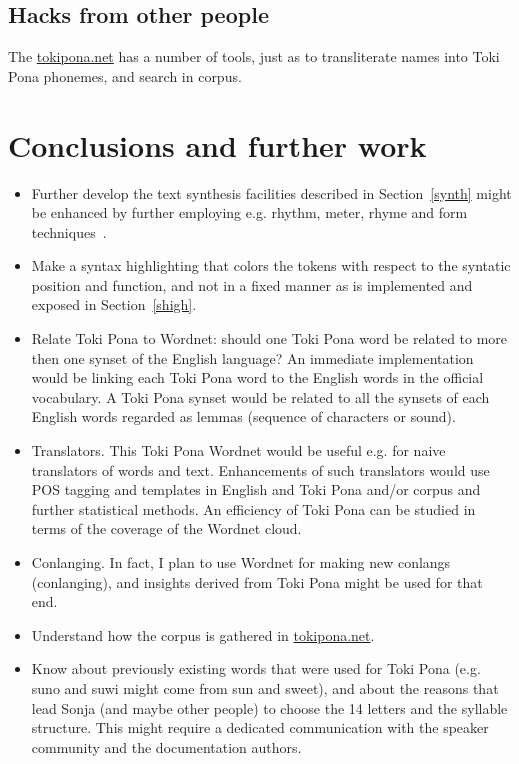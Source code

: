 \documentclass{article}
\begin{document}
\subsection{Hacks from other people}
The \url{tokipona.net} has a number of tools,
just as to transliterate names into Toki Pona phonemes,
and search in corpus.

\section{Conclusions and further work}\label{conc}
\begin{itemize}
  \item Further develop the text synthesis facilities described in
    Section~\ref{synth} might be enhanced by further employing e.g.
    rhythm, meter, rhyme and form techniques~\cite{wikipPoetry}.
  \item Make a syntax highlighting that colors the tokens with respect
    to the syntatic position and function, and not in a fixed manner
    as is implemented and exposed in Section~\ref{shigh}.
  \item Relate Toki Pona to Wordnet: should one Toki Pona word
    be related to more then one synset of the English language?
    An immediate implementation would be linking each Toki Pona word
    to the English words in the official vocabulary.
    A Toki Pona synset would be related to all the synsets of each English
    words regarded as lemmas (sequence of characters or sound).
  \item Translators. This Toki Pona Wordnet would be useful e.g. for naive translators
    of words and text.
    Enhancements of such translators would use POS tagging and templates
    in English and Toki Pona and/or corpus and further statistical methods.
    An efficiency of Toki Pona can be studied in terms of the coverage of
    the Wordnet cloud.
  \item Conlanging. In fact, I plan to use Wordnet for making new conlangs
    (conlanging), and insights derived from Toki Pona might be used for that end.
  \item Understand how the corpus is gathered in \url{tokipona.net}.
  \item Know about previously existing words that were used for Toki Pona
    (e.g. suno and suwi might come from sun and sweet),
    and about the reasons that lead Sonja (and maybe other people)
    to choose the 14 letters and the syllable structure.
    This might require a dedicated communication with the
    speaker community and the documentation authors.

\end{itemize}
\end{document}
